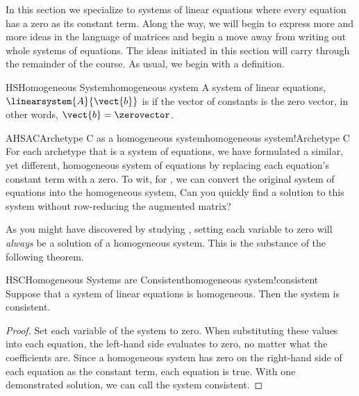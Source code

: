 %
In this section we specialize to systems of linear equations where every equation has a zero as its constant term.  Along the way, we will begin to express more and more ideas in the language of matrices and begin a move away from writing out whole systems of equations.  The ideas initiated in this section will carry through the remainder of the course.  
%
%
As usual, we begin with a definition.
%
\begin{definition}{HS}{Homogeneous System}{homogeneous system}
A system of linear equations, $\linearsystem{A}{\vect{b}}$ is  if the vector of constants is the zero vector, in other words, $\vect{b}=\zerovector$.
%
\end{definition}
%
\begin{example}{AHSAC}{Archetype C as a homogeneous system}{homogeneous system!Archetype C}
For each archetype that is a system of equations, we have formulated a similar, yet different, homogeneous system of equations by replacing each equation's constant term with a zero.  To wit, for , we can convert the original system of equations into the homogeneous system,
%
%
Can you quickly find a solution to this system without row-reducing the augmented matrix?
\end{example}
%
As you might have discovered by studying , setting each variable to zero will {\em always} be a solution of a homogeneous system.  This is the substance of the following theorem.
%
\begin{theorem}{HSC}{Homogeneous Systems are Consistent}{homogeneous system!consistent}
Suppose that a system of linear equations is homogeneous.  Then the system is consistent.
\end{theorem}
%
\begin{proof}
Set each variable of the system to zero.  When substituting these values into each equation, the left-hand side evaluates to zero, no matter what the coefficients are.  Since a homogeneous system has zero on the right-hand side of each equation as the constant term, each equation is true.  With one demonstrated solution, we can call the system consistent.
\end{proof}
